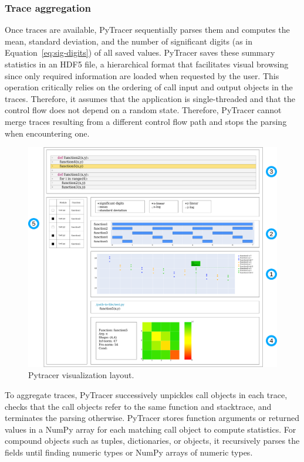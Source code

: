 \documentclass[10pt,journal,compsoc]{IEEEtran}
\newcommand{\pytracer}[0]{PyTracer\xspace}
\DeclareRobustCommand{\add}[1]{#1}
\begin{document}
\subsubsection{Trace aggregation}

Once traces are available, \pytracer sequentially parses them and computes the
mean, standard deviation, and the number of significant digits (as in
Equation~\ref{eq:sig-digits}) of all saved values. \pytracer saves these summary
statistics in an HDF5 file, a hierarchical format that facilitates visual
browsing since only required information are loaded when requested by the user.
This operation critically relies on the ordering of call input and output
objects in the traces. Therefore, it assumes that the application is
single-threaded and that the control flow does not depend on a random state.
\add{Therefore, \mbox{\pytracer} cannot merge traces resulting from a different
    control flow path and stops the parsing when encountering one.}

\begin{figure}
    \centering
    \includegraphics[width=0.75\linewidth]{figure/pytracer_layout.pdf}
    \caption{Pytracer visualization layout.}
    \label{fig:visu-layout}
\end{figure}


To aggregate traces, \pytracer successively unpickles call objects in each
trace, checks that the call objects refer to the same function and stacktrace,
and terminates the parsing otherwise. PyTracer stores function arguments or
returned values in a NumPy array for each matching call object to compute
statistics. For compound objects such as tuples, dictionaries, or objects, it
recursively parses the fields until finding numeric types or NumPy arrays of
numeric types.
\end{document}
